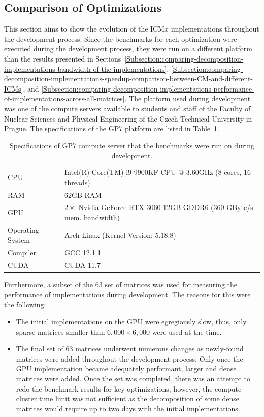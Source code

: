 \subsection{Comparison of Optimizations \TO}
This section aims to show the evolution of the ICM$ x $ implementations throughout the development process. Since the benchmarks for each optimization were executed during the development process, they were run on a different platform than the results presented in Sections~\ref{Subsection:comparing-decomposition-implementations-bandwidth-of-the-implementations}, \ref{Subsection:comparing-decomposition-implementations-speedup-comparison-between-CM-and-different-ICMs}, and \ref{Subsection:comparing-decomposition-implementations-performance-of-implementations-across-all-matrices}. The platform used during development was one of the compute servers available to students and staff of the Faculty of Nuclear Sciences and Physical Engineering of the Czech Technical University in Prague. The specifications of the GP7 platform are listed in Table~\ref{Table:comparing-decomposition-implementations-comparison-of-optimizations}.

\begin{table}[ht!]
	\centering
	\begin{tabular}{|l|l|}
		\hline
		CPU              & Intel(R) Core(TM) i9-9900KF CPU @ 3.60GHz (8 cores, 16 threads) \\
		RAM              & 62GB RAM \\
		GPU              & $ 2\times $ Nvidia GeForce RTX 3060 12GB GDDR6 (360 GByte/s mem. bandwidth) \\
		Operating System & Arch Linux (Kernel Version: 5.18.8) \\
		Compiler         & GCC 12.1.1 \\
		CUDA             & CUDA 11.7 \\ \hline
	\end{tabular}
	\caption{Specifications of GP7 compute server that the benchmarks were run on during development.}
	\label{Table:comparing-decomposition-implementations-comparison-of-optimizations}
\end{table}

Furthermore, a subset of the 63 set of matrices was used for measuring the performance of implementations during development. The reasons for this were the following:

\begin{itemize}
	\item The initial implementations on the GPU were egregiously slow, thus, only sparse matrices smaller than $ 6,000\times 6,000 $ were used at the time.
	\item The final set of 63 matrices underwent numerous changes as newly-found matrices were added throughout the development process. Only once the GPU implementation became adequately performant, larger and dense matrices were added. Once the set was completed, there was an attempt to redo the benchmark results for key optimizations, however, the compute cluster time limit was not sufficient as the decomposition of some dense matrices would require up to two days with the initial implementations.
\end{itemize}

